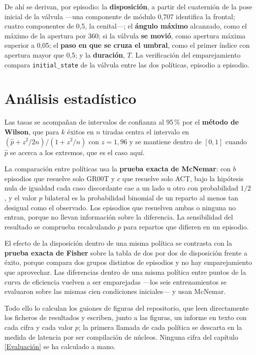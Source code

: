 De ahí se derivan, por episodio: la \textbf{disposición}, a partir del cuaternión de la pose
inicial de la válvula —una componente de módulo 0,707 identifica la frontal; cuatro componentes de
0,5, la cenital—; el \textbf{ángulo máximo} alcanzado, como el máximo de la apertura por
360\textdegree; si la válvula \textbf{se movió}, como apertura máxima superior a 0,05; el
\textbf{paso en que se cruza el umbral}, como el primer índice con apertura mayor que 0,5; y la
\textbf{duración}, $T$. La verificación del emparejamiento compara \texttt{initial\_state} de la
válvula entre las dos políticas, episodio a episodio.

\section{Análisis estadístico}

Las tasas se acompañan de intervalos de confianza al 95\,\% por el \textbf{método de Wilson}, que
para $k$ éxitos en $n$ tiradas centra el intervalo en $(\hat p + z^2/2n)/(1 + z^2/n)$ con
$z = 1{,}96$ y se mantiene dentro de $[0,1]$ cuando $\hat p$ se acerca a los extremos, que es el
caso aquí.

La comparación entre políticas usa la \textbf{prueba exacta de McNemar}: con $b$ episodios que
resuelve solo GR00T y $c$ que resuelve solo ACT, bajo la hipótesis nula de igualdad cada caso
discordante cae a un lado u otro con probabilidad $1/2$, y el valor $p$ bilateral es la
probabilidad binomial de un reparto al menos tan desigual como el observado. Los episodios que
resuelven ambas o ninguna no entran, porque no llevan información sobre la diferencia. La
sensibilidad del resultado se comprueba recalculando $p$ para repartos que difieren en un
episodio.

El efecto de la disposición dentro de una misma política se contrasta con la \textbf{prueba exacta
de Fisher} sobre la tabla de dos por dos de disposición frente a éxito, porque compara dos grupos
distintos de episodios y no hay emparejamiento que aprovechar. Las diferencias dentro de una misma
política entre puntos de la curva de eficiencia vuelven a ser emparejadas —los seis entrenamientos
se evaluaron sobre las mismas cien condiciones iniciales— y usan McNemar.

Todo ello lo calculan los guiones de figuras del repositorio, que leen directamente los ficheros
de resultados y escriben, junto a las figuras, un informe en texto con cada cifra y cada valor
$p$; la primera llamada de cada política se descarta en la medida de latencia por ser compilación
de núcleos. Ninguna cifra del capítulo \ref{Evaluación} se ha calculado a mano.
